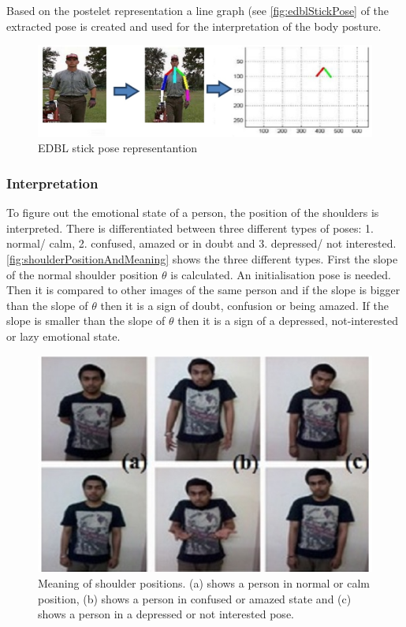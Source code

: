 \documentclass[conference]{IEEEtran}
\begin{document}
Based on the postelet representation a line graph (see \autoref{fig:edblStickPose} of the extracted pose is created and used for the interpretation of the body posture. 

\begin{figure}[H]
\centering
\includegraphics[width=\linewidth]{edblStickPose.jpg}
\caption{EDBL stick pose representantion\cite{singh2015edbl}}
\label{fig:edblStickPose}
\end{figure}

\subsubsection{Interpretation}
To figure out the emotional state of a person, the position of the shoulders is interpreted. There is differentiated between three different types of poses: 1. normal/ calm, 2. confused, amazed or in doubt and 3. depressed/ not interested. \autoref{fig:shoulderPositionAndMeaning} shows the three different types. First the slope of the normal shoulder position $\theta$ is calculated. An initialisation pose is needed. Then it is compared to other images of the same person and if the slope is bigger than the slope of 	$\theta$ then it is a sign of doubt, confusion or being amazed. If the slope is smaller than the slope of $\theta$ then it is a sign of a depressed, not-interested or lazy emotional state.
 
\begin{figure}[H]
\centering
\includegraphics[width=\linewidth]{shoulderPositionAndMeaning.jpg}
\caption{Meaning of shoulder positions. (a) shows a person in normal or calm position, (b) shows a person in confused or amazed state and (c) shows a person in a depressed or not interested pose.\cite{singh2015edbl}}
\label{fig:shoulderPositionAndMeaning}
\end{figure}
\end{document}
